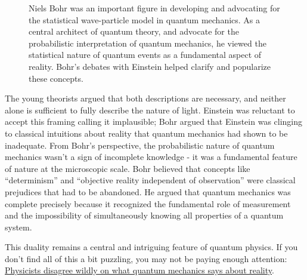 \documentclass[
  letterpaper,
]{book}
\begin{document}
\begin{figure}


\caption{\label{fig-bohr-einstein}Niels Bohr was an important figure in
developing and advocating for the statistical wave-particle model in
quantum mechanics. As a central architect of quantum theory, and
advocate for the probabilistic interpretation of quantum mechanics, he
viewed the statistical nature of quantum events as a fundamental aspect
of reality. Bohr's debates with Einstein helped clarify and popularize
these concepts.}

\end{figure}%

The young theorists argued that both descriptions are necessary, and
neither alone is sufficient to fully describe the nature of light.
Einstein was reluctant to accept this framing calling it implausible;
Bohr argued that Einstein was clinging to classical intuitions about
reality that quantum mechanics had shown to be inadequate. From Bohr's
perspective, the probabilistic nature of quantum mechanics wasn't a sign
of incomplete knowledge - it was a fundamental feature of nature at the
microscopic scale. Bohr believed that concepts like ``determinism'' and
``objective reality independent of observation'' were classical
prejudices that had to be abandoned. He argued that quantum mechanics
was complete precisely because it recognized the fundamental role of
measurement and the impossibility of simultaneously knowing all
properties of a quantum system.

This duality remains a central and intriguing feature of quantum
physics. If you don't find all of this a bit puzzling, you may not be
paying enough attention:
\href{https://www.nature.com/articles/d41586-025-02342-y?utm_source=Live+Audience&utm_campaign=a8d315930b-nature-briefing-daily-20250730&utm_medium=email&utm_term=0_-33f35e09ea-49658492}{Physicists
disagree wildly on what quantum mechanics says about reality}.
\end{document}
